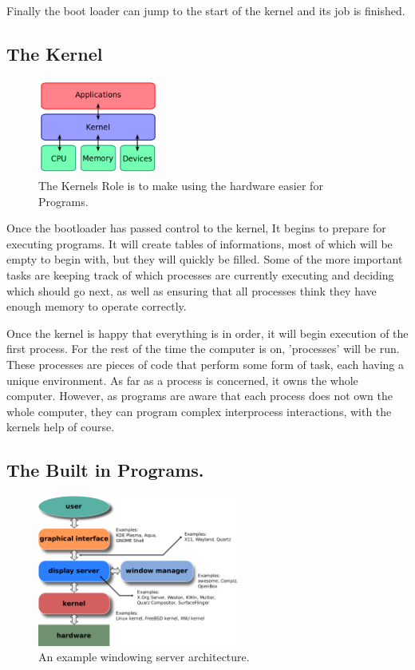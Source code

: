 \documentclass[a4paper]{report}
\begin{document}
Finally the boot loader can jump to the start of the kernel and its job is finished.


\subsection*{The Kernel}

\begin{figure}
\centering
\includegraphics[width=150px]{images/kernel}
\caption{The Kernels Role is to make using the hardware easier for Programs.}
\vspace{-10pt}
\label{fig:thekernel}
\end{figure}

Once the bootloader has passed control to the kernel, It begins to prepare for executing programs. It will create tables of informations, most of which will be empty to begin with, but they will quickly be filled. Some of the more important tasks are keeping track of which processes are currently executing and deciding which should go next, as well as ensuring that all processes think they have enough memory to operate correctly.

Once the kernel is happy that everything is in order, it will begin execution of the first process. For the rest of the time the computer is on, 'processes' will be run. These processes are pieces of code that perform some form of task, each having a unique environment. As far as a process is concerned, it owns the whole computer. However, as programs are aware that each process does not own the whole computer, they can program complex interprocess interactions, with the kernels help of course.


\subsection*{The Built in Programs.}

\begin{figure}
\centering
\includegraphics[width=250px]{images/windowing}
\caption{An example windowing server architecture.}
\label{fig:theserver}
\end{figure}
\end{document}
